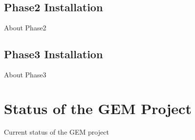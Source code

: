         \subsection{Phase2 Installation}

            About Phase2

        \subsection{Phase3 Installation}

            About Phase3

    \section{Status of the GEM Project}

        Current status of the GEM project
